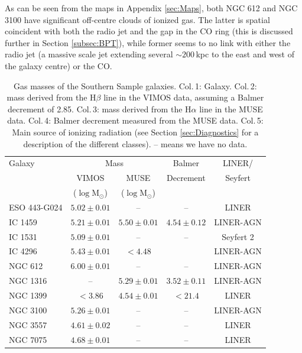 \documentclass[a4paper,fleqn,usenatbib]{mnras}
\begin{document}
	As can be seen from the maps in Appendix \ref{sec:Maps}, both NGC 612 and NGC 3100 have significant off-centre clouds of ionized gas. The latter is spatial coincident with both the radio jet and the gap in the CO ring (this is discussed further in Section \ref{subsec:BPT}), while former seems to no link with either the radio jet (a massive scale jet extending several $\sim 200$\,kpc to the east and west of the galaxy centre) or the CO. 


	\begin{table}
		\centering
		\caption{Gas masses of the Southern Sample galaxies. Col.\,1: Galaxy. Col.\,2:  mass derived from the H$\beta$ line in the VIMOS data, assuming a Balmer decrement of 2.85. Col.\,3:  mass derived from the H$\alpha$ line in the MUSE data. Col.\,4: Balmer decrement measured from the MUSE data. Col.\,5: Main source of ionizing radiation (see Section \ref{sec:Diagnostics} for a description of the different classes). -- means we have no data.}
		\label{tab:gasMass}
		\begin{tabular}{l c c c c}
			\hline
			\hline
			Galaxy & \multicolumn{2}{c}{\ion{H}{ii} Mass} & Balmer & LINER/ \\
			& VIMOS\tnote{a} & MUSE & Decrement & Seyfert \\
			& ($\log\mathrm{M_\odot}$) & ($\log\mathrm{M_\odot}$) & \\
			\hline
			ESO 443-G024 & $5.02 \pm 0.01$ 	& --  		& -- & LINER \\
			IC 1459 	& $5.21 \pm 0.01$	& $5.50 \pm 0.01$ & $4.54 \pm 0.12$ & LINER-AGN\\
			IC 1531 	& $5.09 \pm 0.01$	& -- 		& -- & Seyfert 2\\
			IC 4296		& $5.43 \pm 0.01$	& $< 4.48$ 	& \tnote{b} & LINER-AGN \\
			NGC 612 	& $6.00 \pm 0.01$ 	& -- 		& -- & LINER-AGN \\
			NGC 1316 	& -- 				& $ 5.29 \pm 0.01$ & $3.52 \pm 0.11$ & LINER-AGN \\
			NGC 1399 	& $< 3.86$ 			& $ 4.54 \pm 0.01$ & $< 21.4$\tnote{c} & LINER \\
			NGC 3100 	& $5.26 \pm 0.01$	& -- 		& -- & LINER-AGN \\
			NGC 3557 	& $4.61 \pm 0.02$ 	& -- 		& -- & LINER \\
			NGC 7075 	& $4.68 \pm 0.01$	& -- 		& -- & LINER \\

\end{tabular}
\end{table}
\end{document}
